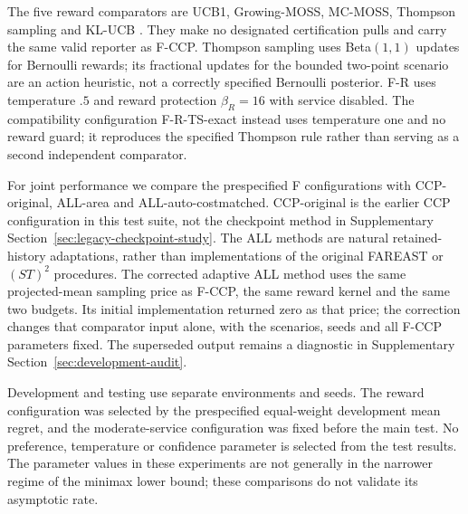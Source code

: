 \documentclass[11pt]{article}
\theoremstyle{remark}
\begin{document}
The five reward comparators are UCB1, Growing-MOSS, MC-MOSS, Thompson sampling and KL-UCB \citep{garivier2011klucb}. They make no designated certification pulls and carry the same valid reporter as F-CCP. Thompson sampling uses Beta$(1,1)$ updates for Bernoulli rewards; its fractional updates for the bounded two-point scenario are an action heuristic, not a correctly specified Bernoulli posterior. F-R uses temperature $.5$ and reward protection $\beta_R=16$ with service disabled. The compatibility configuration F-R-TS-exact instead uses temperature one and no reward guard; it reproduces the specified Thompson rule rather than serving as a second independent comparator.

For joint performance we compare the prespecified F configurations with CCP-original, ALL-area and ALL-auto-costmatched. CCP-original is the earlier CCP configuration in this test suite, not the checkpoint method in Supplementary Section~\ref{sec:legacy-checkpoint-study}. The ALL methods are natural retained-history adaptations, rather than implementations of the original FAREAST or $(ST)^2$ procedures. The corrected adaptive ALL method uses the same projected-mean sampling price as F-CCP, the same reward kernel and the same two budgets. Its initial implementation returned zero as that price; the correction changes that comparator input alone, with the scenarios, seeds and all F-CCP parameters fixed. The superseded output remains a diagnostic in Supplementary Section~\ref{sec:development-audit}.

Development and testing use separate environments and seeds. The reward configuration was selected by the prespecified equal-weight development mean regret, and the moderate-service configuration was fixed before the main test. No preference, temperature or confidence parameter is selected from the test results. The parameter values in these experiments are not generally in the narrower regime of the minimax lower bound; these comparisons do not validate its asymptotic rate.
\end{document}
